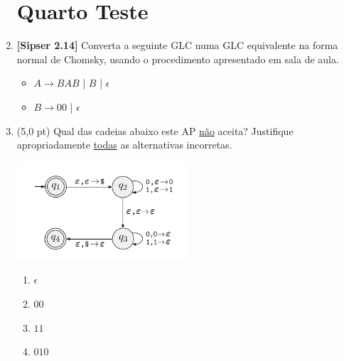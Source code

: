 \documentclass[12pt,a4paper,oneside]{article}
\begin{document}
\begin{enumerate}
	
	\section*{Quarto Teste}
	
	\item {\bf [Sipser 2.14]}  Converta a seguinte GLC numa GLC equivalente na forma normal de Chomsky,
	usando o procedimento apresentado em sala de aula.
	\begin{itemize}
		\item[] $A \rightarrow BAB$ | $B$ | $\epsilon$
		\item[] $B \rightarrow 00$ | $\epsilon$
	\end{itemize}
	
	\item (5,0 pt) Qual das cadeias abaixo este AP \underline{não} aceita? Justifique apropriadamente \underline{todas} as alternativas incorretas.
	
	\begin{center}
		\includegraphics[width=0.5\textwidth]{images/ap3}
	\end{center}
	
	\begin{enumerate}
		\item $\epsilon$
		\item $00$
		\item $11$
		\item $010$ 
		
	\end{enumerate}
	
\end{enumerate}
\end{document}
